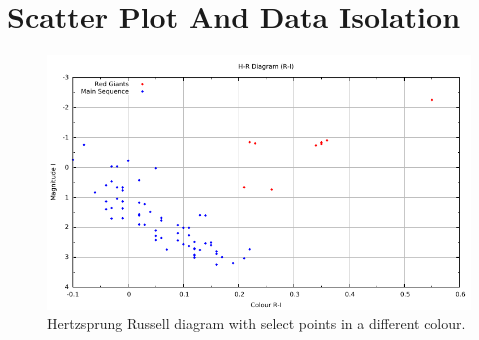 \documentclass[10pt,a4paper,final]{report}
\begin{document}
\section{Scatter Plot And Data Isolation}
\begin{figure}[!hbtp]
\centering
\includegraphics[width=\textwidth]{../CodeLisa/RIHRdiagram/RIHR.pdf}
\caption{Hertzsprung Russell diagram with select points in a different colour.}
\end{figure}

\end{document}
